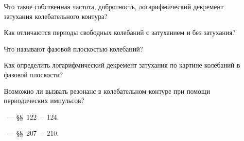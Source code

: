 \begin{lab:questions}
	\item Что такое собственная частота, добротность, логарифмический декремент
затухания колебательного контура?
    \item Как отличаются периоды свободных колебаний с затуханием и без затухания?
	\item Что называют фазовой плоскостью колебаний?
	\item  Как определить логарифмический декремент затухания по картине
колебаний в фазовой плоскости?
	\item  Возможно ли вызвать резонанс в колебательном контуре при помощи
периодических импульсов?
\end{lab:questions}


\begin{lab:literature}
	\item \SivuhinIII~--- \S\S~122~--~124.
	\item \Kalashnikov~--- \S\S~207~--~210.
\end{lab:literature}
